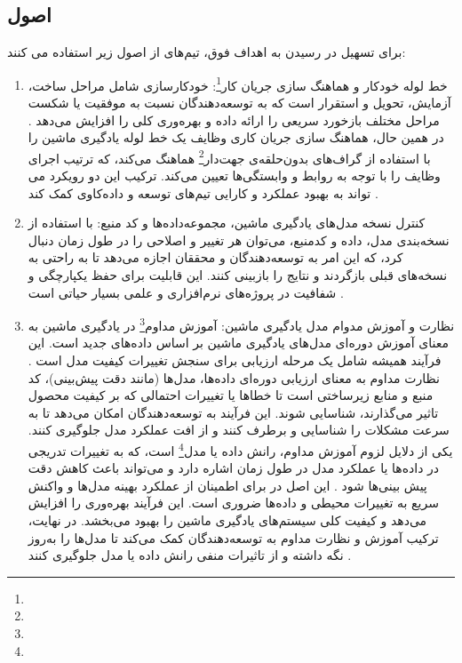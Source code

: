 \subsection{اصول}
برای تسهیل در رسیدن به اهداف فوق، تیم‌های  از اصول زیر استفاده می کنند:
\begin{enumerate}
	\item 
	خط لوله خودکار  و هماهنگ سازی جریان کار\footnote{}:
	خودکارسازی  شامل مراحل ساخت، آزمایش، تحویل و استقرار است که به توسعه‌دهندگان نسبت به موفقیت یا شکست مراحل مختلف بازخورد سریعی را ارائه داده و بهره‌وری کلی را افزایش می‌دهد \cite{MLOpsPipeline1}. در همین حال، هماهنگ سازی جریان کاری وظایف یک خط لوله‌ یادگیری ماشین را با استفاده از گراف‌های بدون‌حلقه‌ی جهت‌دار\footnote{} هماهنگ می‌کند، که ترتیب اجرای وظایف را با توجه به روابط و وابستگی‌ها تعیین می‌کند. ترکیب این دو رویکرد می ‌تواند به بهبود عملکرد و کارایی تیم‌های توسعه و داده‌کاوی کمک کند \cite{MLOpsWO1, MLOpsWO2}.
	\item 
	کنترل نسخه مدل‌های یادگیری ماشین، مجموعه‌داده‌ها و کد منبع:
با استفاده از نسخه‌بندی مدل، داده و کدمنبع، می‌توان هر تغییر و اصلاحی را در طول زمان دنبال کرد، که این امر به توسعه‌دهندگان و محققان اجازه می‌دهد تا به راحتی به نسخه‌های قبلی بازگردند و نتایج را بازبینی کنند. این قابلیت برای حفظ یکپارچگی و شفافیت در پروژه‌های نرم‌افزاری و علمی بسیار حیاتی است \cite{MLOpsPipeline1}.
	\item 
	نظارت و آموزش مدوام مدل یادگیری ماشین:
آموزش مداوم\footnote{} در یادگیری ماشین به معنای آموزش دوره‌ای مدل‌های یادگیری ماشین بر اساس داده‌های جدید است. این فرآیند همیشه شامل یک مرحله ارزیابی برای سنجش تغییرات کیفیت مدل است \cite{MLOpsCT1}. نظارت مداوم به معنای ارزیابی دوره‌ای داده‌ها، مدل‌ها (مانند دقت پیش‌بینی)، کد منبع و  منابع زیرساختی است تا خطاها یا تغییرات احتمالی که بر کیفیت محصول تاثیر می‌گذارند، شناسایی شوند. این فرآیند به توسعه‌دهندگان امکان می‌دهد تا به سرعت مشکلات را شناسایی و برطرف کنند و از افت عملکرد مدل جلوگیری کنند. یکی از دلایل لزوم آموزش مداوم، رانش داده یا مدل\footnote{} است، که به تغییرات تدریجی در داده‌ها یا عملکرد مدل در طول زمان اشاره دارد و می‌تواند باعث کاهش دقت پیش ‌بینی‌ها شود \cite{MLOpsProd1}. این اصل در  برای اطمینان از عملکرد بهینه مدل‌ها و واکنش سریع به تغییرات محیطی و داده‌ها ضروری است. این فرآیند بهره‌وری را افزایش می‌دهد و کیفیت کلی سیستم‌های یادگیری ماشین را بهبود می‌بخشد. در نهایت، ترکیب آموزش و نظارت مداوم به توسعه‌دهندگان کمک می‌کند تا مدل‌ها را به‌روز نگه داشته و از تاثیرات منفی رانش داده یا مدل جلوگیری کنند \cite{MLOpsCT2}.
	

\end{enumerate}
